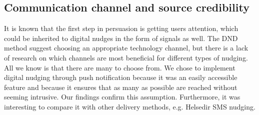 

\subsection{Communication channel and source credibility}
It is known that the first step in persuasion is getting users attention, which could be inherited to digital nudges in the form of signals as well. The DND method \cite{mirsch_making_2018} suggest choosing an appropriate technology channel, but there is a lack of research on which channels are most beneficial for different types of nudging.  All we know is that there are many to choose from. We chose to implement digital nudging through push notification because it was an easily accessible feature and because it ensures that as many as possible are reached without seeming intrusive. Our findings confirm this assumption. Furthermore, it was interesting to compare it with other delivery methods, e.g. Helsedir SMS nudging. 


